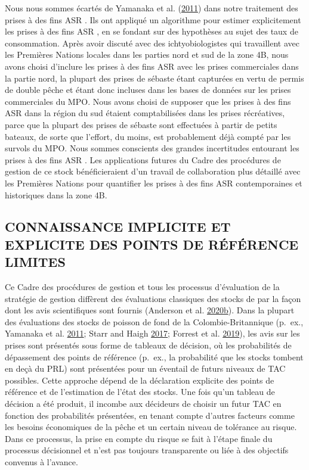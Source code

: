 \documentclass[11pt]{book}
\begin{document}
Nous nous sommes écartés de Yamanaka et al. (\protect\hyperlink{ref-yamanaka2011}{2011}) dans notre traitement des prises à des fins ASR . Ils ont appliqué un algorithme pour estimer explicitement les prises à des fins ASR , en se fondant sur des hypothèses au sujet des taux de consommation. Après avoir discuté avec des ichtyobiologistes qui travaillent avec les Premières Nations locales dans les parties nord et sud de la zone 4B, nous avons choisi d'inclure les prises à des fins ASR avec les prises commerciales dans la partie nord, la plupart des prises de sébaste étant capturées en vertu de permis de double pêche et étant donc incluses dans les bases de données sur les prises commerciales du MPO. Nous avons choisi de supposer que les prises à des fins ASR dans la région du sud étaient comptabilisées dans les prises récréatives, parce que la plupart des prises de sébaste sont effectuées à partir de petits bateaux, de sorte que l'effort, du moins, est probablement déjà compté par les survols du MPO. Nous sommes conscients des grandes incertitudes entourant les prises à des fins ASR . Les applications futures du Cadre des procédures de gestion de ce stock bénéficieraient d'un travail de collaboration plus détaillé avec les Premières Nations pour quantifier les prises à des fins ASR contemporaines et historiques dans la zone 4B.

\hypertarget{sec:discussion-implicit}{%
\subsection{CONNAISSANCE IMPLICITE ET EXPLICITE DES POINTS DE RÉFÉRENCE LIMITES}\label{sec:discussion-implicit}}

Ce Cadre des procédures de gestion et tous les processus d'évaluation de la stratégie de gestion diffèrent des évaluations classiques des stocks de par la façon dont les avis scientifiques sont fournis (Anderson et al. \protect\hyperlink{ref-anderson2020gfmp}{2020}\protect\hyperlink{ref-anderson2020gfmp}{b}). Dans la plupart des évaluations des stocks de poisson de fond de la Colombie-Britannique (p.~ex., Yamanaka et al. \protect\hyperlink{ref-yamanaka2011}{2011}; Starr and Haigh \protect\hyperlink{ref-starr2017}{2017}; Forrest et al. \protect\hyperlink{ref-forrest2019}{2019}), les avis sur les prises sont présentés sous forme de tableaux de décision, où les probabilités de dépassement des points de référence (p.~ex., la probabilité que les stocks tombent en deçà du PRL) sont présentées pour un éventail de futurs niveaux de TAC possibles. Cette approche dépend de la déclaration explicite des points de référence et de l'estimation de l'état des stocks. Une fois qu'un tableau de décision a été produit, il incombe aux décideurs de choisir un futur TAC en fonction des probabilités présentées, en tenant compte d'autres facteurs comme les besoins économiques de la pêche et un certain niveau de tolérance au risque. Dans ce processus, la prise en compte du risque se fait à l'étape finale du processus décisionnel et n'est pas toujours transparente ou liée à des objectifs convenus à l'avance.
\end{document}
